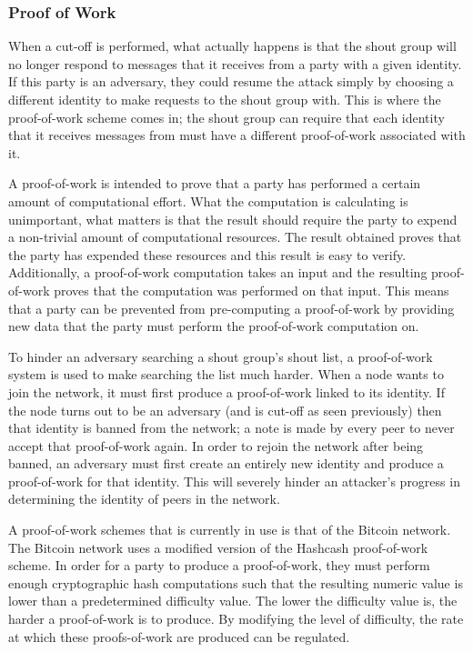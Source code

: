 \documentclass[ %
                    author={Luke Murray},
                supervisor={Dr. Simon Hollis},
                     title={Shadow Peer-to-Peer Networks},
                  subtitle={},
                    degree={MEng},
                      year={2013} ]{thesis}
\begin{document}
\subsubsection{Proof of Work}

When a cut-off is performed, what actually happens is that the shout group will no longer respond to messages that it receives from a party with a given identity. If this party is an adversary, they could resume the attack simply by choosing a different identity to make requests to the shout group with. This is where the proof-of-work scheme comes in; the shout group can require that each identity that it receives messages from must have a different proof-of-work associated with it.

A proof-of-work is intended to prove that a party has performed a certain amount of computational effort. What the computation is calculating is unimportant, what matters is that the result should require the party to expend a non-trivial amount of computational resources. The result obtained proves that the party has expended these resources and this result is easy to verify. Additionally, a proof-of-work computation takes an input and the resulting proof-of-work proves that the computation was performed on that input. This means that a party can be prevented from pre-computing a proof-of-work by providing new data that the party must perform the proof-of-work computation on.

To hinder an adversary searching a shout group's shout list, a proof-of-work system is used to make searching the list much harder. When a node wants to join the network, it must first produce a proof-of-work linked to its identity. If the node turns out to be an adversary (and is cut-off as seen previously) then that identity is banned from the network; a note is made by every peer to never accept that proof-of-work again. In order to rejoin the network after being banned, an adversary must first create an entirely new identity and produce a proof-of-work for that identity. This will severely hinder an attacker's progress in determining the identity of peers in the network.

A proof-of-work schemes that is currently in use is that of the Bitcoin network. The Bitcoin network uses a modified version of the Hashcash \cite{back2002hashcash} proof-of-work scheme. In order for a party to produce a proof-of-work, they must perform enough cryptographic hash computations such that the resulting numeric value is lower than a predetermined difficulty value. The lower the difficulty value is, the harder a proof-of-work is to produce. By modifying the level of difficulty, the rate at which these proofs-of-work are produced can be regulated.
\end{document}
